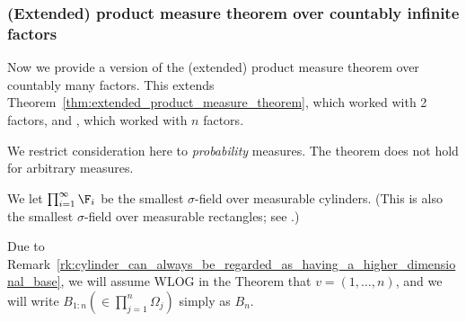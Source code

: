 \documentclass{article} %
\begin{document}
\subsubsection{(Extended) product measure theorem over countably infinite factors}

Now we provide a version of the (extended) product measure theorem over countably many factors.  This extends Theorem~\ref{thm:extended_product_measure_theorem}, which worked with 2 factors, and \cite[Thm 2.6.7]{ash2000probability}, which worked with $n$ factors. 

We restrict consideration here to \textit{probability} measures.  The theorem does not hold for arbitrary measures. 

We let $\prod_{i=1}^\infty \F_i$ be the smallest $\sigma$-field over measurable cylinders.  (This is also the smallest $\sigma$-field over measurable rectangles; see \cite[Sec 2.7, Problem 1]{ash2000probability}.) 

Due to Remark~\ref{rk:cylinder_can_always_be_regarded_as_having_a_higher_dimensional_base}, we will assume WLOG in the Theorem that $v=(1,\hdots,n)$, and we will write $B_{1:n} (\in \prod_{j=1}^n \Omega_j)$ simply as $B_n$.  
\end{document}
